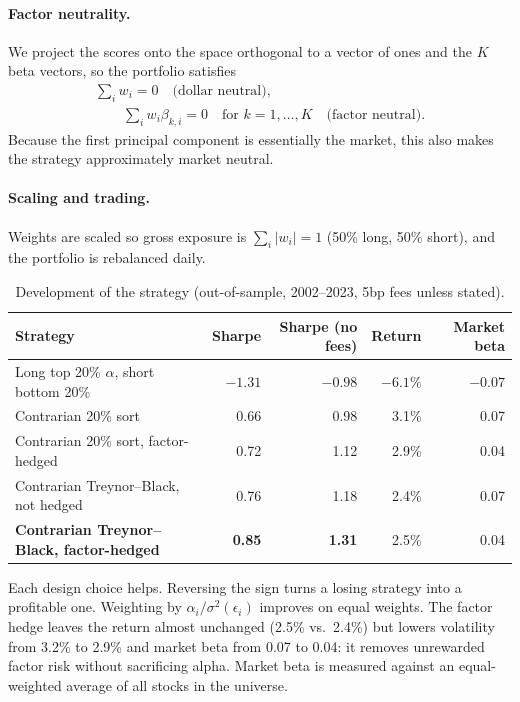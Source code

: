 \documentclass[11pt,letterpaper]{article}
\begin{document}
\paragraph{Factor neutrality.} We project the scores onto the space orthogonal to a vector of
ones and the $K$ beta vectors, so the portfolio satisfies
\[
    \begin{gathered}
        \sum_i w_i = 0 \quad \text{(dollar neutral)}, \\
        \qquad \sum_i w_i \beta_{k,i} = 0 \quad \text{for } k = 1, \dots, K \quad \text{(factor neutral)}.
    \end{gathered}
\]
Because the first principal component is essentially the market, this also makes the strategy
approximately market neutral.

\paragraph{Scaling and trading.} Weights are scaled so gross exposure is $\sum_i |w_i| = 1$
(50\% long, 50\% short), and the portfolio is rebalanced daily.

\begin{table}[!htbp]
    \centering
    \caption{Development of the strategy (out-of-sample, 2002--2023, 5bp fees unless stated).}
    \label{tab:development}
    \begin{tabular}{L{0.46}R{0.11}R{0.18}R{0.12}R{0.13}}
        \toprule
        Strategy & Sharpe & Sharpe (no fees) & Return & Market beta \\
        \midrule
        Long top 20\% $\alpha$, short bottom 20\% & $-1.31$ & $-0.98$ & $-6.1\%$ & $-0.07$ \\
        Contrarian 20\% sort & 0.66 & 0.98 & 3.1\% & 0.07 \\
        Contrarian 20\% sort, factor-hedged & 0.72 & 1.12 & 2.9\% & 0.04 \\
        Contrarian Treynor--Black, not hedged & 0.76 & 1.18 & 2.4\% & 0.07 \\
        \textbf{Contrarian Treynor--Black, factor-hedged} & \textbf{0.85} & \textbf{1.31} & 2.5\% & 0.04 \\
        \bottomrule
    \end{tabular}
\end{table}

Each design choice helps. Reversing the sign turns a losing strategy into a profitable one.
Weighting by $\alpha_i / \sigma^2(\epsilon_i)$ improves on equal weights. The factor hedge
leaves the return almost unchanged (2.5\% vs.\ 2.4\%) but lowers volatility from
3.2\% to 2.9\% and market beta from 0.07 to 0.04: it removes unrewarded factor risk without
sacrificing alpha. Market beta is measured against an equal-weighted average of all stocks in
the universe.
\end{document}
